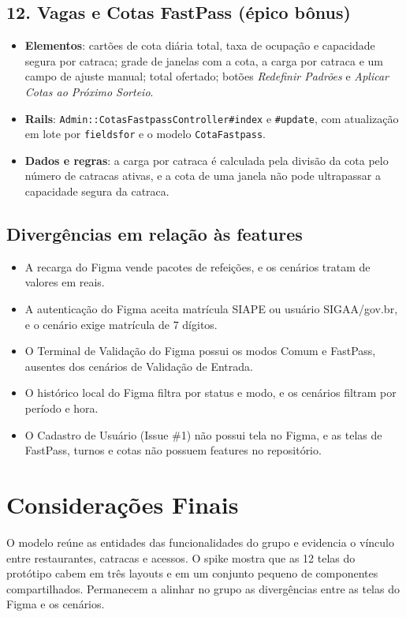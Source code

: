 \documentclass[a4paper,12pt]{article}
\renewcommand{\_}{\textunderscore\allowbreak}
\begin{document}
\subsection*{12. Vagas e Cotas FastPass (épico bônus)}

\begin{itemize}

    \item \textbf{Elementos}: cartões de cota diária total, taxa de ocupação e capacidade segura por catraca; grade de janelas com a cota, a carga por catraca e um campo de ajuste manual; total ofertado; botões \textit{Redefinir Padrões} e \textit{Aplicar Cotas ao Próximo Sorteio}.

    \item \textbf{Rails}: \texttt{Admin::\allowbreak{}CotasFastpassController\#\allowbreak{}index} e \texttt{\#update}, com atualização em lote por \texttt{fields\_for} e o modelo \texttt{CotaFastpass}.

    \item \textbf{Dados e regras}: a carga por catraca é calculada pela divisão da cota pelo número de catracas ativas, e a cota de uma janela não pode ultrapassar a capacidade segura da catraca.

\end{itemize}

\subsection*{Divergências em relação às features}

\begin{itemize}

    \item A recarga do Figma vende pacotes de refeições, e os cenários tratam de valores em reais.

    \item A autenticação do Figma aceita matrícula SIAPE ou usuário SIGAA/gov.br, e o cenário exige matrícula de 7 dígitos.

    \item O Terminal de Validação do Figma possui os modos Comum e FastPass, ausentes dos cenários de Validação de Entrada.

    \item O histórico local do Figma filtra por status e modo, e os cenários filtram por período e hora.

    \item O Cadastro de Usuário (Issue \#1) não possui tela no Figma, e as telas de FastPass, turnos e cotas não possuem features no repositório.

\end{itemize}

\section*{Considerações Finais}

O modelo reúne as entidades das funcionalidades do grupo e evidencia o vínculo entre restaurantes, catracas e acessos. O spike mostra que as 12 telas do protótipo cabem em três layouts e em um conjunto pequeno de componentes compartilhados. Permanecem a alinhar no grupo as divergências entre as telas do Figma e os cenários.
\end{document}
